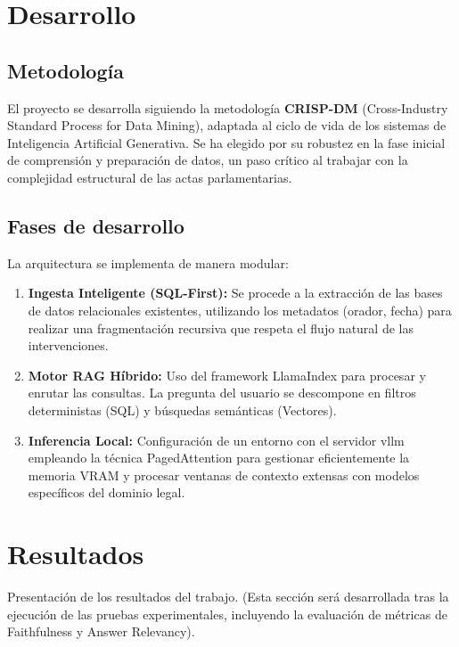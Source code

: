 \documentclass[oneside,12pt]{book}
\begin{document}
\chapter{Desarrollo}
%

\section{Metodología}
El proyecto se desarrolla siguiendo la metodología \textbf{CRISP-DM} (Cross-Industry Standard Process for Data Mining), adaptada al ciclo de vida de los sistemas de Inteligencia Artificial Generativa. Se ha elegido por su robustez en la fase inicial de comprensión y preparación de datos, un paso crítico al trabajar con la complejidad estructural de las actas parlamentarias.

\section{Fases de desarrollo}
La arquitectura se implementa de manera modular:
\begin{enumerate}
    \item \textbf{Ingesta Inteligente (SQL-First):} Se procede a la extracción de las bases de datos relacionales existentes, utilizando los metadatos (orador, fecha) para realizar una fragmentación recursiva que respeta el flujo natural de las intervenciones.
    \item \textbf{Motor RAG Híbrido:} Uso del framework LlamaIndex para procesar y enrutar las consultas. La pregunta del usuario se descompone en filtros deterministas (SQL) y búsquedas semánticas (Vectores).
    \item \textbf{Inferencia Local:} Configuración de un entorno con el servidor \gls{vllm} empleando la técnica PagedAttention para gestionar eficientemente la memoria VRAM y procesar ventanas de contexto extensas con modelos específicos del dominio legal.
\end{enumerate}



\chapter{Resultados}
%

Presentación de los resultados del trabajo. (Esta sección será desarrollada tras la ejecución de las pruebas experimentales, incluyendo la evaluación de métricas de Faithfulness y Answer Relevancy).
\end{document}
